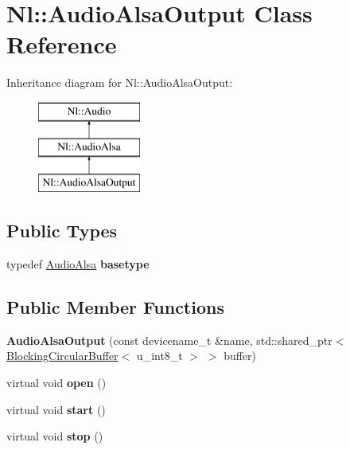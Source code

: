 \hypertarget{classNl_1_1AudioAlsaOutput}{}\section{Nl\+:\+:Audio\+Alsa\+Output Class Reference}
\label{classNl_1_1AudioAlsaOutput}
Inheritance diagram for Nl\+:\+:Audio\+Alsa\+Output\+:\begin{figure}[H]
\begin{center}
\leavevmode
\includegraphics[height=3.000000cm]{classNl_1_1AudioAlsaOutput}
\end{center}
\end{figure}
\subsection*{Public Types}
\begin{DoxyCompactItemize}
\item 
\hypertarget{classNl_1_1AudioAlsaOutput_abd57cd3efbb62397d017dc0eff54da3e}{}typedef \hyperlink{classNl_1_1AudioAlsa}{Audio\+Alsa} {\bfseries basetype}\label{classNl_1_1AudioAlsaOutput_abd57cd3efbb62397d017dc0eff54da3e}

\end{DoxyCompactItemize}
\subsection*{Public Member Functions}
\begin{DoxyCompactItemize}
\item 
\hypertarget{classNl_1_1AudioAlsaOutput_a9b435f17aa699d4c6fe031f6755f4a52}{}{\bfseries Audio\+Alsa\+Output} (const devicename\+\_\+t \&name, std\+::shared\+\_\+ptr$<$ \hyperlink{classNl_1_1BlockingCircularBuffer}{Blocking\+Circular\+Buffer}$<$ u\+\_\+int8\+\_\+t $>$ $>$ buffer)\label{classNl_1_1AudioAlsaOutput_a9b435f17aa699d4c6fe031f6755f4a52}

\item 
\hypertarget{classNl_1_1AudioAlsaOutput_a94792430810853353314a71f1b54a5d3}{}virtual void {\bfseries open} ()\label{classNl_1_1AudioAlsaOutput_a94792430810853353314a71f1b54a5d3}

\item 
\hypertarget{classNl_1_1AudioAlsaOutput_a9d2239af344a6773942add0dc38514d3}{}virtual void {\bfseries start} ()\label{classNl_1_1AudioAlsaOutput_a9d2239af344a6773942add0dc38514d3}

\item 
\hypertarget{classNl_1_1AudioAlsaOutput_acd8cb8bfe0722c1c20d8da0f3963683e}{}virtual void {\bfseries stop} ()\label{classNl_1_1AudioAlsaOutput_acd8cb8bfe0722c1c20d8da0f3963683e}

\end{DoxyCompactItemize}
